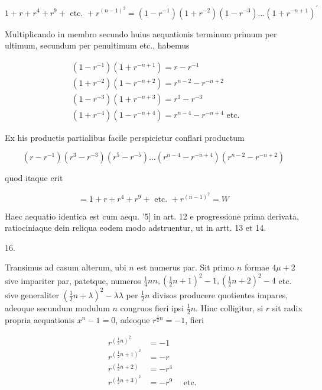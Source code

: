 \documentclass[10pt]{article}
\begin{document}
\[
1+r+r^{4}+r^{9}+\text { etc. }+r^{(n-1)^{2}}=\left(1-r^{-1}\right)\left(1+r^{-2}\right)\left(1-r^{-3}\right) \ldots\left(1+r^{-n+1}\right)^{\prime}
\]

Multiplicando in membro secundo huius aequationis terminum primum per ultimum, secundum per penultimum etc., habemus

\[
\begin{aligned}
& \left(1-r^{-1}\right)\left(1+r^{-n+1}\right)=r-r^{-1} \\
& \left(1+r^{-2}\right)\left(1-r^{-n+2}\right)=r^{n-2}-r^{-n+2} \\
& \left(1-r^{-3}\right)\left(1+r^{-n+3}\right)=r^{3}-r^{-3} \\
& \left(1+r^{-4}\right)\left(1-r^{-n+4}\right)=r^{n-4}-r^{-n+4} \text { etc. }
\end{aligned}
\]

Ex his productis partialibus facile perspicietur conflari productum

\[
\left(r-r^{-1}\right)\left(r^{3}-r^{-3}\right)\left(r^{5}-r^{-5}\right) \ldots\left(r^{n-4}-r^{-n+4}\right)\left(r^{n-2}-r^{-n+2}\right)
\]

quod itaque erit

\[
=1+r+r^{4}+r^{9}+\text { etc. }+r^{(n-1)^{2}}=W
\]

Haec aequatio identica est cum aequ. '5] in art. 12 e progressione prima derivata, ratiociniaque dein reliqua eodem modo adstruentur, ut in artt. 13 et 14.

16.

Transimus ad casum alterum, ubi \(n\) est numerus par. Sit primo \(n\) formae \(4 \mu+2\) sive impariter par, patetque, numeros \(\frac{1}{4} n n,\left(\frac{1}{2} n+1\right)^{2}-1,\left(\frac{1}{2} n+2\right)^{2}-4\) etc. sive generaliter \(\left(\frac{1}{2} n+\lambda\right)^{2}-\lambda \lambda\) per \(\frac{1}{2} n\) divisos producere quotientes impares, adeoque secundum modulum \(n\) congruos fieri ipsi \(\frac{1}{2} n\). Hinc colligitur, si \(r\) sit radix propria aequationis \(x^{n}-1=0\), adeoque \(r^{\frac{1}{2} n}=-1\), fieri

\[
\begin{aligned}
r^{\left(\frac{1}{2} n\right)^{2}} & =-1 \\
r^{\left(\frac{1}{2} n+1\right)^{2}} & =-r \\
r^{\left(\frac{1}{2} n+2\right)} & =-r^{4} \\
r^{\left(\frac{1}{2} n+3\right)^{2}} & =-r^{9} \quad \text { etc. }
\end{aligned}
\]
\end{document}
